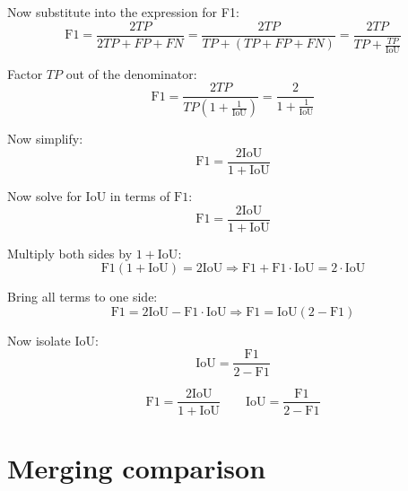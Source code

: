     Now substitute into the expression for F1:
    \[
    \text{F1} = \frac{2TP}{2TP + FP + FN} = \frac{2TP}{TP + (TP + FP + FN)} = \frac{2TP}{TP + \frac{TP}{\text{IoU}}}
    \]
    
    Factor \(TP\) out of the denominator:
    \[
    \text{F1} = \frac{2TP}{TP \left(1 + \frac{1}{\text{IoU}}\right)} = \frac{2}{1 + \frac{1}{\text{IoU}}}
    \]
    
    Now simplify:
    \[
    \text{F1} = \frac{2\text{IoU}}{1 + \text{IoU}}
    \]
    
    \noindent
    Now solve for \(\text{IoU}\) in terms of \(\text{F1}\):
    \[
    \text{F1} = \frac{2\text{IoU}}{1 + \text{IoU}}
    \]
    
    Multiply both sides by \(1 + \text{IoU}\):
    \[
    \text{F1}(1 + \text{IoU}) = 2\text{IoU}
    \Rightarrow \text{F1} + \text{F1} \cdot \text{IoU} = 2 \cdot \text{IoU}
    \]
    
    Bring all terms to one side:
    \[
    \text{F1} = 2\text{IoU} - \text{F1} \cdot \text{IoU}
    \Rightarrow \text{F1} = \text{IoU}(2 - \text{F1})
    \]
    
    Now isolate \(\text{IoU}\):
    \[
    \text{IoU} = \frac{\text{F1}}{2 - \text{F1}}
    \]
    
    \begin{equation}
    \boxed{
    \text{F1} = \frac{2\text{IoU}}{1 + \text{IoU}} \qquad
    \text{IoU} = \frac{\text{F1}}{2 - \text{F1}}
    }
    \label{eq:conversion}
\end{equation}


\section{Merging comparison}

